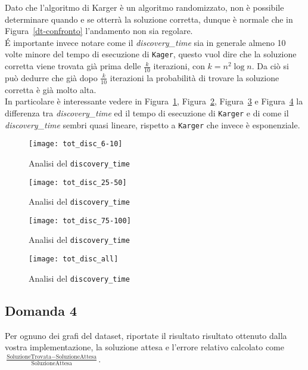 Dato che l'algoritmo di Karger è un algoritmo randomizzato, non è possibile determinare quando e se otterrà la soluzione corretta, dunque è normale che in Figura~\ref{dt-confronto} l'andamento non sia regolare.\\
\'E importante invece notare come il \textit{discovery\_time} sia in generale almeno 10 volte minore del tempo di esecuzione di \texttt{Kager}, questo vuol dire che la soluzione corretta viene trovata già prima delle $\frac{k}{10}$ iterazioni, con $k = n^2 \log n$. Da ciò si può dedurre che già dopo $\frac{k}{10}$ iterazioni la probabilità di trovare la soluzione corretta è già molto alta.\\
In particolare è interessante vedere in Figura~\ref{dt-confronto1}, Figura~\ref{dt-confronto2}, Figura~\ref{dt-confronto3} e Figura~\ref{dt-confronto4} la differenza tra \textit{discovery\_time} ed il tempo di esecuzione di \texttt{Karger} e di come il \textit{discovery\_time} sembri quasi lineare, rispetto a \texttt{Karger} che invece è esponenziale.

\begin{figure}[H]
	\centering
	\texttt{[image: tot\_disc\_6-10]}
	\caption{Analisi del \texttt{discovery\_time}}
	\label{dt-confronto1}
\end{figure}

\begin{figure}[H]
	\centering
	\texttt{[image: tot\_disc\_25-50]}
	\caption{Analisi del \texttt{discovery\_time}}
	\label{dt-confronto2}
\end{figure}

\begin{figure}[H]
	\centering
	\texttt{[image: tot\_disc\_75-100]}
	\caption{Analisi del \texttt{discovery\_time}}
	\label{dt-confronto3}
\end{figure}

\begin{figure}[H]
	\centering
	\texttt{[image: tot\_disc\_all]}
	\caption{Analisi del \texttt{discovery\_time}}
	\label{dt-confronto4}
\end{figure}

\subsection{Domanda 4}
Per ognuno dei grafi del dataset, riportate il risultato risultato ottenuto dalla vostra implementazione, la soluzione attesa e l'errore relativo calcolato come $ \frac{\textrm{SoluzioneTrovata}-\textrm{SoluzioneAttesa}}{\textrm{SoluzioneAttesa}}$.

